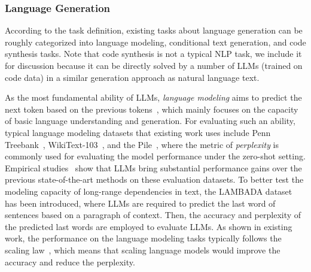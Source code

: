 \subsubsection{Language Generation}
\label{sec-langauge-generation}
According to the task definition, existing tasks about language generation can be roughly categorized into language modeling, conditional text generation, and code synthesis tasks. Note that code synthesis is not a typical NLP task, we include it for discussion because it can be directly solved by a number of LLMs (trained on code data) in a similar generation approach as natural language text.   

As the most fundamental ability of LLMs, \emph{language modeling} aims  to predict the next token based on the previous tokens~\cite{Bengio-JMLR-2003-A}, which mainly focuses on the capacity of basic language understanding and generation.  For evaluating such an ability, typical language modeling datasets that existing work uses include Penn Treebank~\cite{Marcus-CL-1993-Building}, WikiText-103~\cite{Merity-ICLR-2017-Pointer}, and the Pile~\cite{Gao-arxiv-2021-Pile}, where the metric of \emph{perplexity} is commonly used for evaluating the model performance under the zero-shot setting. 
Empirical studies~\cite{Brown-NeurIPS-2020-Language,Zeng-arxiv-2022-GLM} show that LLMs bring substantial performance gains over the previous state-of-the-art methods on these evaluation datasets. 
To better test the modeling capacity of long-range dependencies in text, the LAMBADA dataset~\cite{Paperno-ACL-2016-LAMBADA} has been introduced, where LLMs are required to predict the last word of sentences based on a paragraph of context.
Then, the accuracy and perplexity of the predicted last words are employed  to evaluate LLMs. 
As shown in existing work, the performance on the language modeling tasks typically follows the scaling law~\cite{Kaplan-arxiv-2020-Scaling}, which means that scaling language models would improve the accuracy and reduce the perplexity.


